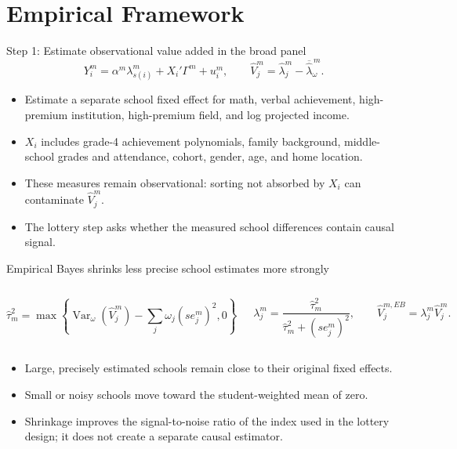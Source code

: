 \documentclass[11pt,aspectratio=169]{beamer}
\let\oldparencite\parencite
\renewcommand{\parencite}[2][]{%
  \footnotesize {\tiny \oldparencite[#1]{#2}} \normalsize%
}
\newenvironment{wideitemize}{%
  \begin{minipage}{0.92\textwidth}
  \begin{itemize}
  \addtolength{\itemsep}{0.85em}
}{%
  \end{itemize}
  \end{minipage}
}
\begin{document}
\section{Empirical Framework}

\begin{frame}{Step 1: Estimate observational value added in the broad panel}
\[
  Y_i^m
  =
  \alpha^m
  \lambda_{s(i)}^m
  + X_i'\Gamma^m
  + u_i^m,
  \qquad
  \widehat V_j^m
  =
  \widehat\lambda_j^m-\overline{\widehat\lambda}^{\,m}_{\omega}.
\]

\small
\begin{itemize}
  \addtolength{\itemsep}{0.6em}
  \item Estimate a separate school fixed effect for math, verbal achievement, high-premium institution, high-premium field, and log projected income.

  \item $X_i$ includes grade-4 achievement polynomials, family background, middle-school grades and attendance, cohort, gender, age, and home location.

  \item These measures remain observational: sorting not absorbed by $X_i$ can contaminate $\widehat V_j^m$.

  \item The lottery step asks whether the measured school differences contain causal signal.
\end{itemize}
\end{frame}

\begin{frame}{Empirical Bayes shrinks less precise school estimates more strongly}
\small
\begin{columns}[c,onlytextwidth]
  \[
    \widehat\tau_m^2
    =
    \max\left\{
      \operatorname{Var}_{\omega}(\widehat V_j^m)
      -\sum_j\omega_j(se_j^m)^2,
      0
    \right\}
  \]

  \[
    \lambda_j^m
    =
    \frac{\widehat\tau_m^2}
    {\widehat\tau_m^2+(se_j^m)^2},
    \qquad
    \widehat V_j^{m,EB}
    =
    \lambda_j^m\widehat V_j^m.
  \]
\end{columns}

\vspace{0.9em}
\begin{wideitemize}
  \item Large, precisely estimated schools remain close to their original fixed effects.
  \item Small or noisy schools move toward the student-weighted mean of zero. \parencite{walters_chapter_2024}
  \item Shrinkage improves the signal-to-noise ratio of the index used in the lottery design; it does not create a separate causal estimator.
\end{wideitemize}
\end{frame}
\end{document}
